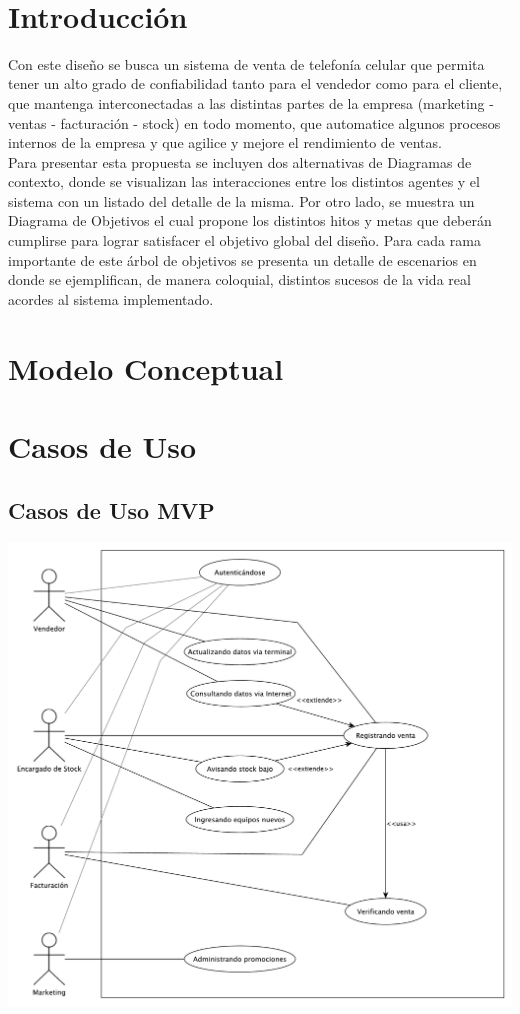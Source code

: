 ‌\section{Introducción}
Con este diseño se busca un sistema de venta de telefonía celular que permita tener un alto grado de confiabilidad tanto para el vendedor como para el cliente, que mantenga interconectadas a las distintas partes de la empresa (marketing - ventas - facturación - stock) en todo momento, que automatice algunos procesos internos de la empresa y que agilice y mejore el rendimiento de ventas.\\
\indent Para presentar esta propuesta se incluyen dos alternativas de Diagramas de contexto, donde se visualizan las interacciones entre los distintos agentes y el sistema con un listado del detalle de la misma. Por otro lado, se muestra un Diagrama de Objetivos el cual propone los distintos hitos y metas que deberán cumplirse para lograr satisfacer el objetivo global del diseño. Para cada rama importante de este árbol de objetivos se presenta un detalle de escenarios en donde se ejemplifican, de manera coloquial, distintos sucesos de la vida real acordes al sistema implementado.\\

\section{Modelo Conceptual}

\clearpage

\section{Casos de Uso}

\subsection{Casos de Uso MVP}

\includegraphics[width=1\textwidth]{./imagenes/casos_de_uso_mvp.pdf}

